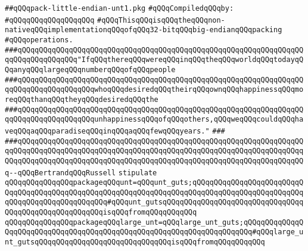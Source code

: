 \label{src/lib/std/src/pack-little-endian-unt1.pkg}
\verb|##qQQqpack-little-endian-unt1.pkg|\newline
\newline
\verb|#qQQqCompiledqQQqby:|\newline
\verb|#qQQqqQQqqQQqqQQqqQQq|\newline
\newline
\verb|#qQQqThisqQQqisqQQqtheqQQqnon-nativeqQQqimplementationqQQqofqQQq32-bitqQQqbig-endianqQQqpacking|\newline
\verb|#qQQqoperations.|\newline
\newline
\verb|###qQQqqQQqqQQqqQQqqQQqqQQqqQQqqQQqqQQqqQQqqQQqqQQqqQQqqQQqqQQqqQQqqQQqqQQqqQQqqQQqqQQq"IfqQQqthereqQQqwereqQQqinqQQqtheqQQqworldqQQqtodayqQQqanyqQQqlargeqQQqnumberqQQqofqQQqpeople|\newline
\verb|###qQQqqQQqqQQqqQQqqQQqqQQqqQQqqQQqqQQqqQQqqQQqqQQqqQQqqQQqqQQqqQQqqQQqqQQqqQQqqQQqqQQqqQQqwhoqQQqdesiredqQQqtheirqQQqownqQQqhappinessqQQqmoreqQQqthanqQQqtheyqQQqdesiredqQQqthe|\newline
\verb|###qQQqqQQqqQQqqQQqqQQqqQQqqQQqqQQqqQQqqQQqqQQqqQQqqQQqqQQqqQQqqQQqqQQqqQQqqQQqqQQqqQQqqQQqunhappinessqQQqofqQQqothers,qQQqweqQQqcouldqQQqhaveqQQqaqQQqparadiseqQQqinqQQqaqQQqfewqQQqyears."|\newline
\verb|###|\newline
\verb|###qQQqqQQqqQQqqQQqqQQqqQQqqQQqqQQqqQQqqQQqqQQqqQQqqQQqqQQqqQQqqQQqqQQqqQQqqQQqqQQqqQQqqQQqqQQqqQQqqQQqqQQqqQQqqQQqqQQqqQQqqQQqqQQqqQQqqQQqqQQqqQQqqQQqqQQqqQQqqQQqqQQqqQQqqQQqqQQqqQQqqQQqqQQqqQQqqQQqqQQqqQQqqQQq--qQQqBertrandqQQqRussell|\newline
\newline
\newline
\newline
\verb|stipulate|\newline
\verb|qQQqqQQqqQQqqQQqpackageqQQqunt=qQQqunt_guts;qQQqqQQqqQQqqQQqqQQqqQQqqQQqqQQqqQQqqQQqqQQqqQQqqQQqqQQqqQQqqQQqqQQqqQQqqQQqqQQqqQQqqQQqqQQqqQQqqQQqqQQqqQQqqQQqqQQqqQQq#qQQqunt_gutsqQQqqQQqqQQqqQQqqQQqqQQqqQQqqQQqqQQqqQQqqQQqqQQqqQQqqQQqisqQQqfromqQQqqQQqqQQq|\newline
\verb|qQQqqQQqqQQqqQQqpackageqQQqlarge_unt=qQQqlarge_unt_guts;qQQqqQQqqQQqqQQqqQQqqQQqqQQqqQQqqQQqqQQqqQQqqQQqqQQqqQQqqQQqqQQqqQQqqQQq#qQQqlarge_unt_gutsqQQqqQQqqQQqqQQqqQQqqQQqqQQqqQQqisqQQqfromqQQqqQQqqQQq|\newline
